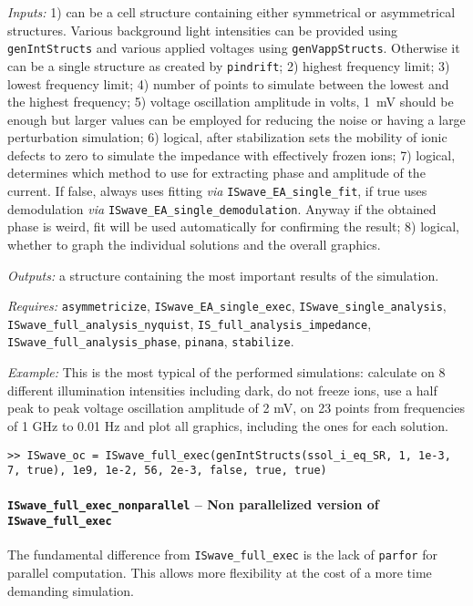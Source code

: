 \textit{Inputs:} 1) can be a cell structure containing either symmetrical or asymmetrical structures. Various background
light intensities can be provided using \texttt{gen\-Int\-Structs} and various applied voltages using \texttt{gen\-Vapp\-Structs}.
     Otherwise it can be a single structure as created by \texttt{pindrift};
   2) highest frequency limit;
   3) lowest frequency limit;
   4) number of points to simulate between the lowest and
     the highest frequency;
   5) voltage oscillation amplitude in volts, \SI{1}{\mV} should be enough but larger values can be employed for reducing the noise or having a large perturbation simulation;
   6) logical, after stabilization sets the mobility of
     ionic defects to zero to simulate the impedance with effectively frozen ions;
   7) logical, determines which method to use for extracting phase and amplitude of the current.
    If false, always uses fitting \textsl{via} \texttt{ISwave\_EA\_single\_fit}, if true uses demodulation \textsl{via} \texttt{ISwave\_EA\_single\_demodulation}. Anyway if the obtained phase is weird, fit will be used
     automatically for confirming the result;
   8) logical, whether to graph the individual solutions and
     the overall graphics.

\textit{Outputs:} a structure containing the most important results of the simulation.

\textit{Requires:} \texttt{asymmetricize}, \texttt{ISwave\_EA\_single\_exec},
   \texttt{ISwave\_single\_analysis}, \texttt{ISwave\_full\_analysis\_nyquist},
   \texttt{IS\_full\_analysis\_impedance}, \texttt{ISwave\_full\_analysis\_phase}, \texttt{pinana},
   \texttt{stabilize}.


\textit{Example:} This is the most typical of the performed simulations: calculate on 8 different illumination intensities including dark, do not freeze ions, use a half peak to peak
     voltage oscillation amplitude of 2 mV, on 23 points from frequencies of 1 GHz to
     0.01 Hz and plot all graphics, including the ones for each solution.
\begin{lstlisting}[style=Matlab-editor]
>> ISwave_oc = ISwave_full_exec(genIntStructs(ssol_i_eq_SR, 1, 1e-3, 7, true), 1e9, 1e-2, 56, 2e-3, false, true, true)
\end{lstlisting}

\paragraph{\texttt{ISwave\_full\_exec\_nonparallel} -- Non parallelized version of \texttt{ISwave\_full\_exec}}
The fundamental difference from \texttt{ISwave\_full\_exec} is the lack of \texttt{parfor}
 for parallel computation. This allows more flexibility at the cost of a
 more time demanding simulation.

